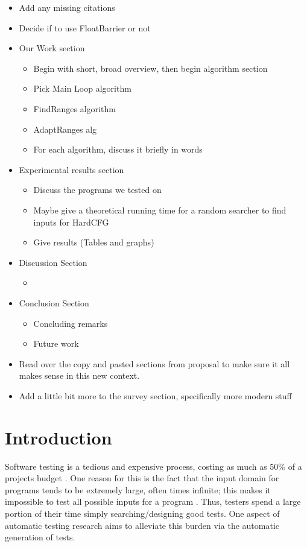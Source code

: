 \documentclass[runningheads]{llncs}
\begin{document}
\begin{itemize}
\item Add any missing citations
\item Decide if to use FloatBarrier or not
\item Our Work section
     \begin{itemize}
     \item Begin with short, broad overview, then begin algorithm section
     \item Pick Main Loop algorithm
     \item FindRanges algorithm
     \item AdaptRanges alg
     \item For each algorithm, discuss it briefly in words
     \end{itemize}
\item Experimental results section
     \begin{itemize}
     \item Discuss the programs we tested on
     \item Maybe give a theoretical running time for a random searcher to find inputs for HardCFG
     \item Give results (Tables and graphs)
     \end{itemize}
\item Discussion Section
     \begin{itemize}
     \item 
     \end{itemize}
\item Conclusion Section
     \begin{itemize}
     \item Concluding remarks
     \item Future work
     \end{itemize}
\item Read over the copy and pasted sections from proposal to make sure it all makes sense in this new context.
\item Add a little bit more to the survey section, specifically more modern stuff
\end{itemize}

\section{Introduction}
Software testing is a tedious and expensive process, costing as much as 50\% of a projects budget \cite{meyers1}. One reason for this is the fact that the input domain for programs tends to be extremely large, often times infinite; this makes it impossible to test all possible inputs for a program \cite{meyers1}. Thus, testers spend a large portion of their time simply searching/designing good tests. One aspect of automatic testing research aims to alleviate this burden via the automatic generation of tests.
\end{document}
